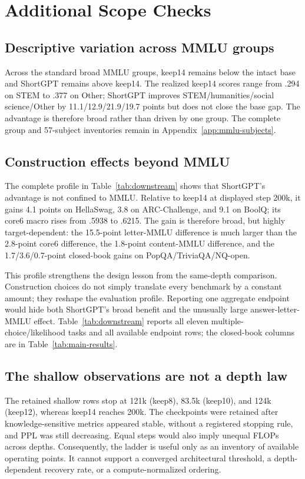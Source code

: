 \section{Additional Scope Checks}
\label{sec:analysis}

\subsection{Descriptive variation across MMLU groups}

Across the standard broad MMLU groups, keep14 remains below the intact base and
ShortGPT remains above keep14. The realized keep14 scores range from .294 on
STEM to .377 on Other; ShortGPT improves STEM/humanities/social science/Other
by 11.1/12.9/21.9/19.7 points but does not close the base gap. The advantage is
therefore broad rather than driven by one group. The complete group and
57-subject inventories remain in Appendix~\ref{app:mmlu-subjects}.

\subsection{Construction effects beyond MMLU}

The complete profile in Table~\ref{tab:downstream} shows that ShortGPT's
advantage is not confined to MMLU. Relative to keep14 at displayed step 200k,
it gains 4.1 points on HellaSwag, 3.8 on ARC-Challenge, and 9.1 on BoolQ; its
core6 macro rises from .5938 to .6215. The gain is therefore broad, but highly
target-dependent: the 15.5-point letter-MMLU difference is much larger than the
2.8-point core6 difference, the 1.8-point content-MMLU difference, and the
1.7/3.6/0.7-point closed-book gains on PopQA/TriviaQA/NQ-open.

This profile strengthens the design lesson from the same-depth comparison.
Construction choices do not simply translate every benchmark by a constant
amount; they reshape the evaluation profile. Reporting one aggregate endpoint
would hide both ShortGPT's broad benefit and the unusually large
answer-letter-MMLU effect. Table~\ref{tab:downstream} reports all eleven
multiple-choice/likelihood tasks and all available endpoint rows; the
closed-book columns are in Table~\ref{tab:main-results}.

\subsection{The shallow observations are not a depth law}
The retained shallow rows stop at 121k (keep8), 83.5k (keep10), and 124k
(keep12), whereas keep14 reaches 200k. The checkpoints were retained after
knowledge-sensitive metrics appeared stable, without a registered stopping
rule, and PPL was still decreasing. Equal steps would also imply unequal FLOPs
across depths. Consequently, the ladder is useful only as an inventory of
available operating points. It cannot support a converged architectural
threshold, a depth-dependent recovery rate, or a compute-normalized ordering.

